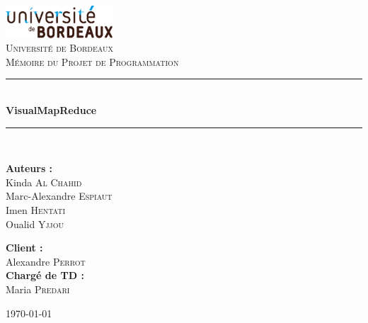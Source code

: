 \documentclass[12pt,a4paper]{report}
\newcommand{\HRule}{\rule{\linewidth}{0.5mm}}
\begin{document}
\begin{titlepage}
\begin{center}
\includegraphics[width=0.3\textwidth]{images/universite_bordeaux_logo.pdf}\\[1cm]    
\textsc{\LARGE Université de Bordeaux}\\[1.5cm]
\textsc{\Large Mémoire du Projet de Programmation}\\[0.5cm]
\vspace{30pt}
\HRule \\[0.4cm]
{ \huge \bfseries VisualMapReduce}\\[0.4cm]
\HRule \\[1.5cm]
\begin{minipage}{0.4\textwidth}
\begin{flushleft} \large
\textbf{Auteurs :}\\
Kinda \textsc{Al Chahid}\\
Marc-Alexandre \textsc{Espiaut}\\
Imen \textsc{Hentati}\\
Oualid \textsc{Yjjou}
\end{flushleft}
\end{minipage}
\begin{minipage}{0.4\textwidth}
\begin{flushright} \large
\textbf{Client :} \\
Alexandre \textsc{Perrot}\\
\textbf{Chargé de TD :} \\
Maria \textsc{Predari}
\end{flushright}
\end{minipage}
\vfill
{\large \today}
\end{center}
\end{titlepage}

\tableofcontents












\end{document}
